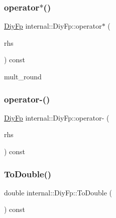 \mbox{\label{structinternal_1_1DiyFp_a9868841f824924cc385ad5163c9c85b3}} 
\subsubsection{\texorpdfstring{operator$\ast$()}{operator*()}}
{\footnotesize\ttfamily \hyperlink{structinternal_1_1DiyFp}{Diy\+Fp} internal\+::\+Diy\+Fp\+::operator$\ast$ (\begin{DoxyParamCaption}\item[{const \hyperlink{structinternal_1_1DiyFp}{Diy\+Fp} \&}]{rhs }\end{DoxyParamCaption}) const\hspace{0.3cm}{\ttfamily [inline]}}

mult\+\_\+round \mbox{\label{structinternal_1_1DiyFp_a9cea201daabec04c6f2526b35af8ead3}} 
\subsubsection{\texorpdfstring{operator-\/()}{operator-()}}
{\footnotesize\ttfamily \hyperlink{structinternal_1_1DiyFp}{Diy\+Fp} internal\+::\+Diy\+Fp\+::operator-\/ (\begin{DoxyParamCaption}\item[{const \hyperlink{structinternal_1_1DiyFp}{Diy\+Fp} \&}]{rhs }\end{DoxyParamCaption}) const\hspace{0.3cm}{\ttfamily [inline]}}

\mbox{\label{structinternal_1_1DiyFp_acf0e7974f0a1175ae04edf8e4a7d1319}} 
\subsubsection{\texorpdfstring{To\+Double()}{ToDouble()}}
{\footnotesize\ttfamily double internal\+::\+Diy\+Fp\+::\+To\+Double (\begin{DoxyParamCaption}{ }\end{DoxyParamCaption}) const\hspace{0.3cm}{\ttfamily [inline]}}



